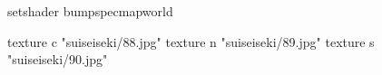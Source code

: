 setshader bumpspecmapworld

    texture c "suiseiseki/88.jpg"
    texture n "suiseiseki/89.jpg"
    texture s "suiseiseki/90.jpg"

